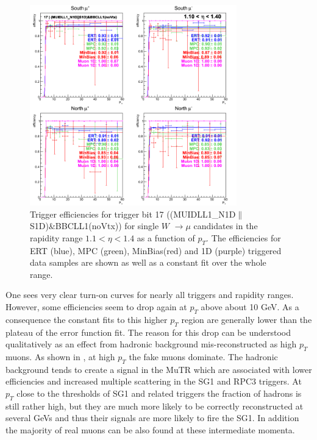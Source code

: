 \begin{figure}[ht]
  \centering
  \includegraphics[width=0.8\textwidth]{./figures/run13_trigeffipt_eta0_trig17_lin.png}
  \caption{
    Trigger efficiencies for trigger bit 17
    ((MUIDLL1\_N1D$\|$S1D)\&BBCLL1(noVtx)) for single $W$ $\rightarrow \mu$
    candidates in the rapidity range $ 1.1 < \eta < 1.4$ as a function of
    $p_T$. The efficiencies for ERT (blue), MPC (green),
    MinBias(red) and 1D (purple) triggered data samples are shown as well as a
    constant fit over the whole range.
  }
  \label{fig:run13_trigeffipt_eta0_nper0_trig17_lin} 
\end{figure}

One sees very clear turn-on curves for nearly all triggers and rapidity ranges.
However, some efficiencies seem to drop again at $p_T$ above about
10 GeV. As a consequence the constant fits to this higher $p_T$
region are generally lower than the plateau of the error function fit. The
reason for this drop can be understood qualitatively as an effect from hadronic
background mis-reconstructed as high $p_T$ muons. As shown in \cite{an1024}, at
high $p_T$ the fake muons dominate. The hadronic background tends
to create a signal in the MuTR which are associated with lower efficiencies and
increased multiple scattering in the SG1 and RPC3 triggers. At $p_T$ close to
the thresholds of SG1 and related triggers the fraction of hadrons is still
rather high, but they are much more likely to be correctly reconstructed at
several GeVs and thus their signals are more likely to fire the SG1. In addition
the majority of real muons can be also found at these intermediate momenta. 

